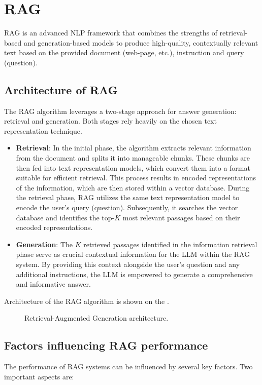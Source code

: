 \section{\acf{RAG}}
\ac{RAG} \cite{lewis2021retrievalaugmented} \nocite{umarjamilai} is an advanced \ac{NLP} framework that combines the strengths of retrieval-based and generation-based models to produce high-quality, contextually relevant text based on the provided document (web-page, etc.), instruction and query (question). 

\subsection{Architecture of \ac{RAG}}
The \ac{RAG} algorithm leverages a two-stage approach for answer generation: retrieval and generation.
Both stages rely heavily on the chosen text representation technique.

\begin{itemize}
  \item \textbf{Retrieval}:
 In the initial phase, the algorithm extracts relevant information from the document and splits it into manageable chunks.
 These chunks are then fed into text representation models, which convert them into a format suitable for efficient retrieval.
 This process results in encoded representations of the information, which are then stored within a vector database.
 During the retrieval phase, \ac{RAG} utilizes the same text representation model to encode the user's query (question).
 Subsequently, it searches the vector database and identifies the top-$K$ most relevant passages based on their encoded representations.
  \item \textbf{Generation}:
 The $K$ retrieved passages identified in the information retrieval phase serve as crucial contextual information for the \ac{LLM} within the \ac{RAG} system.
 By providing this context alongside the user's question and any additional instructions, the \ac{LLM} is empowered to generate a comprehensive and informative answer.
\end{itemize}

Architecture of the \ac{RAG} algorithm is shown on the .

\begin{figure}[h]
 \centering
  
 \caption{Retrieval-Augmented Generation architecture.}
  \label{fig:RAG_scheme}
\end{figure}

\subsection{Factors influencing \ac{RAG} performance}
The performance of \ac{RAG} systems can be influenced by several key factors.
Two important aspects are:


